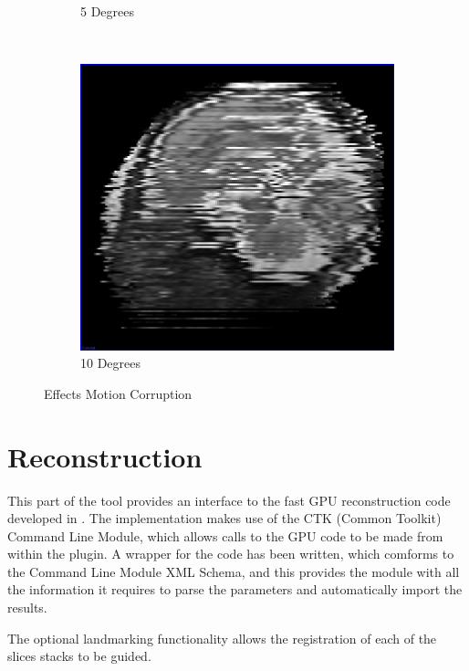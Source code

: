 \begin{figure}[H]
\begin{subfigure}[b]{0.32\textwidth}
    \caption{5 Degrees}\label{fig:scan_simulation_5_degrees}
  \end{subfigure}%
  ~ %
  \begin{subfigure}[b]{0.32\textwidth}
    \includegraphics[width=\textwidth]{images/scan_simulation/scan_simulation_10.png}
    \caption{10 Degrees}\label{fig:scan_simulation_10_degrees}
  \end{subfigure}
  \caption{Effects Motion Corruption}\label{fig:threshold_settings_result}
\end{figure}

\clearpage
\section{Reconstruction}
This part of the tool provides an interface to the fast GPU reconstruction code developed in \cite{uncertaintysvd}. The implementation makes use of the CTK (Common Toolkit) Command Line Module\cite{ctkcmd}, which allows calls to the GPU code to be made from within the plugin. A wrapper for the code has been written, which comforms to the Command Line Module XML Schema, and this provides the module with all the information it requires to parse the parameters and automatically import the results.

The optional landmarking functionality allows the registration of each of the slices stacks to be guided.

